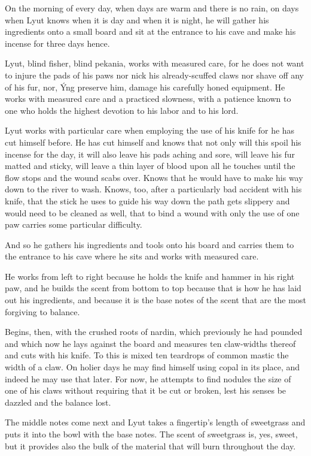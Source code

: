 

On the morning of every day, when days are warm and there is no rain, on days when Lyut knows when it is day and when it is night, he will gather his ingredients onto a small board and sit at the entrance to his cave and make his incense for three days hence.

Lyut, blind fisher, blind pekania, works with measured care, for he does not want to injure the pads of his paws nor nick his already-scuffed claws nor shave off any of his fur, nor, Ýng preserve him, damage his carefully honed equipment. He works with measured care and a practiced slowness, with a patience known to one who holds the highest devotion to his labor and to his lord.

Lyut works with particular care when employing the use of his knife for he has cut himself before. He has cut himself and knows that not only will this spoil his incense for the day, it will also leave his pads aching and sore, will leave his fur matted and sticky, will leave a thin layer of blood upon all he touches until the flow stops and the wound scabs over. Knows that he would have to make his way down to the river to wash. Knows, too, after a particularly bad accident with his knife, that the stick he uses to guide his way down the path gets slippery and would need to be cleaned as well, that to bind a wound with only the use of one paw carries some particular difficulty.

And so he gathers his ingredients and tools onto his board and carries them to the entrance to his cave where he sits and works with measured care.

He works from left to right because he holds the knife and hammer in his right paw, and he builds the scent from bottom to top because that is how he has laid out his ingredients, and because it is the base notes of the scent that are the most forgiving to balance.

Begins, then, with the crushed roots of nardin, which previously he had pounded and which now he lays against the board and measures ten claw-widths thereof and cuts with his knife. To this is mixed ten teardrops of common mastic the width of a claw. On holier days he may find himself using copal in its place, and indeed he may use that later. For now, he attempts to find nodules the size of one of his claws without requiring that it be cut or broken, lest his senses be dazzled and the balance lost.

The middle notes come next and Lyut takes a fingertip's length of sweetgrass and puts it into the bowl with the base notes. The scent of sweetgrass is, yes, sweet, but it provides also the bulk of the material that will burn throughout the day.

